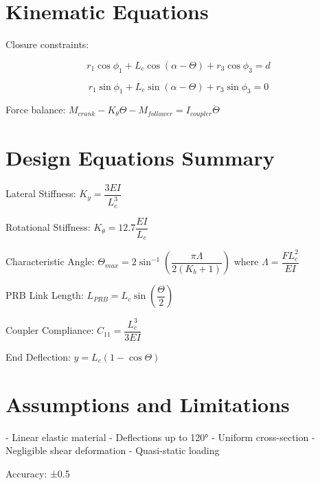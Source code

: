 \documentclass{article}
\begin{document}
\section{Kinematic Equations}

Closure constraints:

\[ r_1 \cos\phi_1 + L_c \cos(\alpha - \Theta) + r_3 \cos\phi_3 = d \]

\[ r_1 \sin\phi_1 + L_c \sin(\alpha - \Theta) + r_3 \sin\phi_3 = 0 \]

Force balance: $M_{crank} - K_\theta \Theta - M_{follower} = I_{coupler} \ddot{\Theta}$

\section{Design Equations Summary}

Lateral Stiffness: $K_y = \dfrac{3EI}{L_c^3}$

Rotational Stiffness: $K_\theta = 12.7 \dfrac{EI}{L_c}$

Characteristic Angle: $\Theta_{max} = 2\sin^{-1}\left(\dfrac{\pi \Lambda}{2(K_b+1)}\right)$ where $\Lambda = \dfrac{FL_c^2}{EI}$

PRB Link Length: $L_{PRB} = L_c \sin\left(\dfrac{\Theta}{2}\right)$

Coupler Compliance: $C_{11} = \dfrac{L_c^3}{3EI}$

End Deflection: $y = L_c\left(1 - \cos\Theta\right)$

\section{Assumptions and Limitations}

- Linear elastic material
- Deflections up to 120°
- Uniform cross-section
- Negligible shear deformation
- Quasi-static loading

Accuracy: ±0.5%
\end{document}
